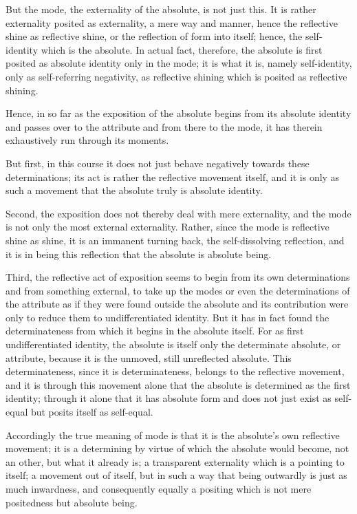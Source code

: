 But the mode, the externality of the absolute, is not just this.
It is rather externality posited as externality,
a mere way and manner,
hence the reflective shine as reflective shine,
or the reflection of form into itself;
hence, the self-identity which is the absolute.
In actual fact, therefore, the absolute is first posited
as absolute identity only in the mode;
it is what it is, namely self-identity,
only as self-referring negativity,
as reflective shining which is posited as reflective shining.

Hence, in so far as the exposition of the absolute
begins from its absolute identity
and passes over to the attribute
and from there to the mode,
it has therein exhaustively run through its moments.

But first, in this course it does not just behave
negatively towards these determinations;
its act is rather the reflective movement itself,
and it is only as such a movement that
the absolute truly is absolute identity.

Second, the exposition does not thereby deal with mere externality,
and the mode is not only the most external externality.
Rather, since the mode is reflective shine as shine,
it is an immanent turning back, the self-dissolving reflection,
and it is in being this reflection that
the absolute is absolute being.

Third, the reflective act of exposition seems to begin
from its own determinations and from something external,
to take up the modes or even the determinations of the attribute
as if they were found outside the absolute
and its contribution were only to reduce them
to undifferentiated identity.
But it has in fact found the determinateness
from which it begins in the absolute itself.
For as first undifferentiated identity,
the absolute is itself only the determinate absolute,
or attribute, because it is the unmoved,
still unreflected absolute.
This determinateness, since it is determinateness,
belongs to the reflective movement,
and it is through this movement alone
that the absolute is determined as the first identity;
through it alone that it has absolute form
and does not just exist as self-equal
but posits itself as self-equal.

Accordingly the true meaning of mode is that
it is the absolute's own reflective movement;
it is a determining by virtue of which
the absolute would become, not an other,
but what it already is;
a transparent externality
which is a pointing to itself;
a movement out of itself,
but in such a way that being outwardly is
just as much inwardness,
and consequently equally a positing
which is not mere positedness
but absolute being.

